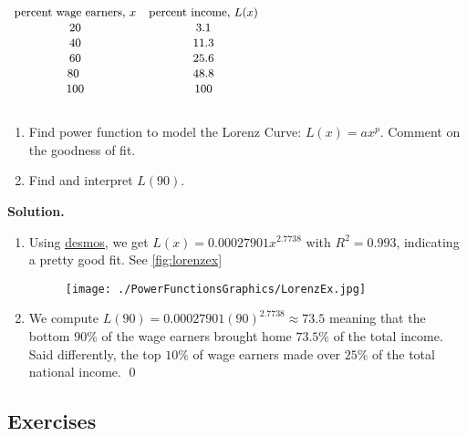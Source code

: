\begin{table}
\begin{center}
  
$ \begin{array}{cc}

\text{\small percent wage earners, $x$} & \text{\small percent income, $L(x)$} \\

\text{\small  20} & \text{\small 3.1}\\

\text{\small 40}  & \text{\small 11.3}  \\

\text{\small 60}  & \text{\small 25.6}  \\

\text{\small 80 }&   \text{\small 48.8}  \\

\text{\small 100}  &  \text{\small 100}  \\

\end{array} $

\caption{}
\label{tab:percentwageearners}
\end{center}
\end{table}

\begin{ex} \label{LorenzEx}  $~$

\begin{enumerate}

\item Find power function to model the Lorenz Curve: $L(x) = ax^p$.  Comment on the goodness of fit.  

\item Find and interpret $L(90)$.

\end{enumerate}

{\bf Solution.}  

\begin{enumerate}

\item Using \href{https://www.desmos.com/}{\underline{desmos}}, we get $L(x) = 0.00027901x^{2.7738}$ with $R^2 = 0.993$, indicating a pretty good fit. See \autoref{fig:lorenzex}

\begin{figure}
\begin{center}

\texttt{[image: ./PowerFunctionsGraphics/LorenzEx.jpg]}

\caption{}
\label{fig:lorenzex}
\end{center}
\end{figure}

\item We compute $L(90) = 0.00027901(90)^{2.7738} \approx 73.5$ meaning that the bottom $90 \%$ of the wage earners brought home $73.5 \%$ of the total income.  Said differently, the top $10 \%$ of wage earners made over $25 \%$ of the total national income.  \qed

\end{enumerate}
 
\end{ex}

\clearpage

\subsection{Exercises}



\closegraphsfile